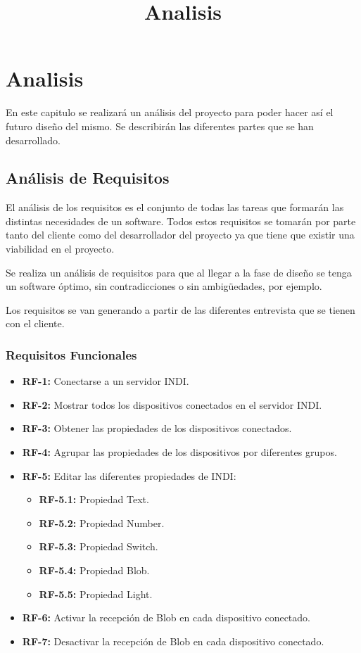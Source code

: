 \chapter{Analisis}
\title{Analisis}
\label{cap:Analisis}

En este capitulo se realizará un análisis del proyecto para poder hacer así el futuro diseño del mismo.
Se describirán las diferentes partes que se han desarrollado.

\section{Análisis de Requisitos}
El análisis de los requisitos es el conjunto de todas las tareas que formarán las distintas necesidades de un software. Todos estos requisitos se tomarán por parte tanto del cliente como del desarrollador del proyecto ya que tiene que existir una viabilidad en el proyecto.

Se realiza un análisis de requisitos para que al llegar a la fase de diseño se tenga un software óptimo, sin contradicciones o sin ambigüedades, por ejemplo.

Los requisitos se van generando a partir de las diferentes entrevista que se tienen con el cliente.

\subsection{Requisitos Funcionales}
\begin{itemize}
  \item \textbf{RF-1:} Conectarse a un servidor INDI.
  \item \textbf{RF-2:} Mostrar todos los dispositivos conectados en el servidor INDI.
  \item \textbf{RF-3:} Obtener las propiedades de los dispositivos conectados.
  \item \textbf{RF-4:} Agrupar las propiedades de los dispositivos por diferentes grupos.
  \item \textbf{RF-5:} Editar las diferentes propiedades de INDI:
  \begin{itemize}
    \item \textbf{RF-5.1:} Propiedad Text.
    \item \textbf{RF-5.2:} Propiedad Number.
    \item \textbf{RF-5.3:} Propiedad Switch.
    \item \textbf{RF-5.4:} Propiedad Blob.
    \item \textbf{RF-5.5:} Propiedad Light.
  \end{itemize}
  \item \textbf{RF-6:} Activar la recepción de Blob en cada dispositivo conectado.
  \item \textbf{RF-7:} Desactivar la recepción de Blob en cada dispositivo conectado.
\end{itemize}

